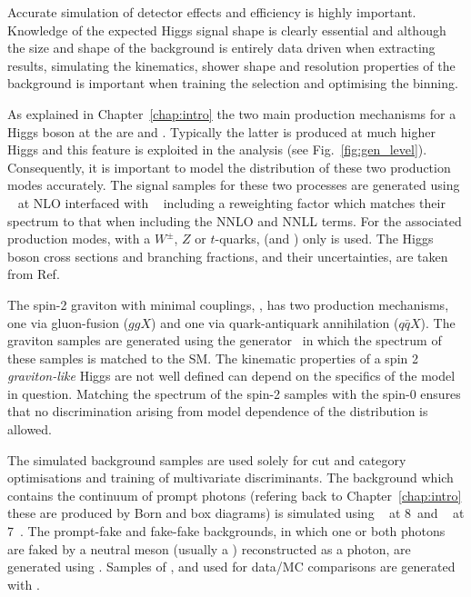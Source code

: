Accurate simulation of detector effects and efficiency is highly important. Knowledge of the expected Higgs signal shape is clearly essential and although the size and shape of the \mgg background is entirely data driven when extracting results, simulating the kinematics, shower shape and resolution properties of the background is important when training the selection and optimising the binning. 

As explained in Chapter~\ref{chap:intro} the two main production mechanisms for a \SM Higgs boson at the \LHC are \ggH and \VBF. Typically the latter is produced at much higher Higgs \pT and this feature is exploited in the analysis (see Fig.~\ref{fig:gen_level}). Consequently, it is important to model the \pT distribution of these two production modes accurately. The signal samples for these two processes are generated using \POWHEG~\cite{powheg1,powheg2} at NLO interfaced with \PYTHIA~\cite{pythia} including a reweighting factor which matches their \pT spectrum to that when including the NNLO and NNLL terms. For the associated production modes, with a $W^{\pm}$, $Z$ or $t$-quarks, (\VH and \ttH) only \PYTHIA is used. The \SM Higgs boson cross sections and branching fractions, and their uncertainties, are taken from Ref.~\cite{LHCHiggsCrossSectionWorkingGroup3}

The spin-2 graviton with minimal couplings, \graviton, has two production mechanisms, one via gluon-fusion ($ggX$) and one via quark-antiquark annihilation ($q\bar{q}X$). The graviton samples are generated using the \JHU generator~\cite{jhu} in which the \pT spectrum of these samples is matched to the SM. The kinematic properties of a spin 2 \textit{graviton-like} Higgs are not well defined can depend on the specifics of the model in question. Matching the \pT spectrum of the spin-2 samples with the \SM spin-0 ensures that no discrimination arising from model dependence of the \pT distribution is allowed. 

The simulated background samples are used solely for cut and category optimisations and training of multivariate discriminants. The background which contains the \QCD continuum of prompt photons (refering back to Chapter~\ref{chap:intro} these are produced by Born and box diagrams) is simulated using \SHERPA~\cite{sherpa} at 8~\TeV and \MADGRAPH~\cite{madgraph} at 7~\TeV. The prompt-fake and fake-fake backgrounds, in which one or both photons are faked by a neutral meson (usually a \pizero) reconstructed as a photon, are generated using \PYTHIA. Samples of \Zee, \Zmumu and \Zmumugamma used for data/MC comparisons are generated with \POWHEG.

